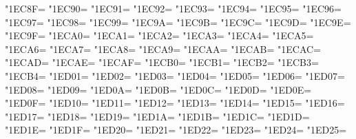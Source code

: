 \XeTeXcharclass"1EC8F=\KclassArabU
\XeTeXcharclass"1EC90=\KclassArabU
\XeTeXcharclass"1EC91=\KclassArabU
\XeTeXcharclass"1EC92=\KclassArabU
\XeTeXcharclass"1EC93=\KclassArabU
\XeTeXcharclass"1EC94=\KclassArabU
\XeTeXcharclass"1EC95=\KclassArabU
\XeTeXcharclass"1EC96=\KclassArabU
\XeTeXcharclass"1EC97=\KclassArabU
\XeTeXcharclass"1EC98=\KclassArabU
\XeTeXcharclass"1EC99=\KclassArabU
\XeTeXcharclass"1EC9A=\KclassArabU
\XeTeXcharclass"1EC9B=\KclassArabU
\XeTeXcharclass"1EC9C=\KclassArabU
\XeTeXcharclass"1EC9D=\KclassArabU
\XeTeXcharclass"1EC9E=\KclassArabU
\XeTeXcharclass"1EC9F=\KclassArabU
\XeTeXcharclass"1ECA0=\KclassArabU
\XeTeXcharclass"1ECA1=\KclassArabU
\XeTeXcharclass"1ECA2=\KclassArabU
\XeTeXcharclass"1ECA3=\KclassArabU
\XeTeXcharclass"1ECA4=\KclassArabU
\XeTeXcharclass"1ECA5=\KclassArabU
\XeTeXcharclass"1ECA6=\KclassArabU
\XeTeXcharclass"1ECA7=\KclassArabU
\XeTeXcharclass"1ECA8=\KclassArabU
\XeTeXcharclass"1ECA9=\KclassArabU
\XeTeXcharclass"1ECAA=\KclassArabU
\XeTeXcharclass"1ECAB=\KclassArabU
\XeTeXcharclass"1ECAC=\KclassArabU
\XeTeXcharclass"1ECAD=\KclassArabU
\XeTeXcharclass"1ECAE=\KclassArabU
\XeTeXcharclass"1ECAF=\KclassArabU
\XeTeXcharclass"1ECB0=\KclassArabU
\XeTeXcharclass"1ECB1=\KclassArabU
\XeTeXcharclass"1ECB2=\KclassArabU
\XeTeXcharclass"1ECB3=\KclassArabU
\XeTeXcharclass"1ECB4=\KclassArabU
\XeTeXcharclass"1ED01=\KclassArabU
\XeTeXcharclass"1ED02=\KclassArabU
\XeTeXcharclass"1ED03=\KclassArabU
\XeTeXcharclass"1ED04=\KclassArabU
\XeTeXcharclass"1ED05=\KclassArabU
\XeTeXcharclass"1ED06=\KclassArabU
\XeTeXcharclass"1ED07=\KclassArabU
\XeTeXcharclass"1ED08=\KclassArabU
\XeTeXcharclass"1ED09=\KclassArabU
\XeTeXcharclass"1ED0A=\KclassArabU
\XeTeXcharclass"1ED0B=\KclassArabU
\XeTeXcharclass"1ED0C=\KclassArabU
\XeTeXcharclass"1ED0D=\KclassArabU
\XeTeXcharclass"1ED0E=\KclassArabU
\XeTeXcharclass"1ED0F=\KclassArabU
\XeTeXcharclass"1ED10=\KclassArabU
\XeTeXcharclass"1ED11=\KclassArabU
\XeTeXcharclass"1ED12=\KclassArabU
\XeTeXcharclass"1ED13=\KclassArabU
\XeTeXcharclass"1ED14=\KclassArabU
\XeTeXcharclass"1ED15=\KclassArabU
\XeTeXcharclass"1ED16=\KclassArabU
\XeTeXcharclass"1ED17=\KclassArabU
\XeTeXcharclass"1ED18=\KclassArabU
\XeTeXcharclass"1ED19=\KclassArabU
\XeTeXcharclass"1ED1A=\KclassArabU
\XeTeXcharclass"1ED1B=\KclassArabU
\XeTeXcharclass"1ED1C=\KclassArabU
\XeTeXcharclass"1ED1D=\KclassArabU
\XeTeXcharclass"1ED1E=\KclassArabU
\XeTeXcharclass"1ED1F=\KclassArabU
\XeTeXcharclass"1ED20=\KclassArabU
\XeTeXcharclass"1ED21=\KclassArabU
\XeTeXcharclass"1ED22=\KclassArabU
\XeTeXcharclass"1ED23=\KclassArabU
\XeTeXcharclass"1ED24=\KclassArabU
\XeTeXcharclass"1ED25=\KclassArabU
